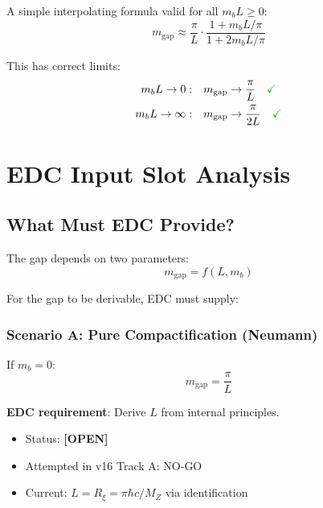 \documentclass[11pt,a4paper]{article}
\newcommand{\Rxi}{R_\xi}
\newcommand{\mgap}{m_{\mathrm{gap}}}
\newcommand{\mb}{m_b}
\newcommand{\MZ}{M_Z}
\newcommand{\tagOPEN}{\textbf{[OPEN]}}
\newcommand{\emark}{\textcolor{green!70!black}{\checkmark}}
\theoremstyle{definition}
\theoremstyle{plain}
\theoremstyle{remark}
\begin{document}
A simple interpolating formula valid for all $\mb L \geq 0$:
\begin{equation}
\mgap \approx \frac{\pi}{L}\cdot\frac{1 + \mb L/\pi}{1 + 2\mb L/\pi}
\label{eq:interpolating}
\end{equation}

This has correct limits:
\begin{align}
\mb L \to 0: &\quad \mgap \to \frac{\pi}{L} \quad \emark \label{eq:interp-0} \\
\mb L \to \infty: &\quad \mgap \to \frac{\pi}{2L} \quad \emark \label{eq:interp-inf}
\end{align}

\section{EDC Input Slot Analysis}
\label{sec:edc-slot}

\subsection{What Must EDC Provide?}

The gap depends on two parameters:
\begin{equation}
\mgap = f(L, \mb)
\label{eq:gap-depends}
\end{equation}

For the gap to be derivable, EDC must supply:

\subsubsection{Scenario A: Pure Compactification (Neumann)}

If $\mb = 0$:
\begin{equation}
\mgap = \frac{\pi}{L}
\label{eq:scenario-a}
\end{equation}

\textbf{EDC requirement}: Derive $L$ from internal principles.

\begin{itemize}
\item Status: \tagOPEN{}
\item Attempted in v16 Track A: NO-GO
\item Current: $L = \Rxi = \pi\hbar c/\MZ$ via identification
\end{itemize}
\end{document}
